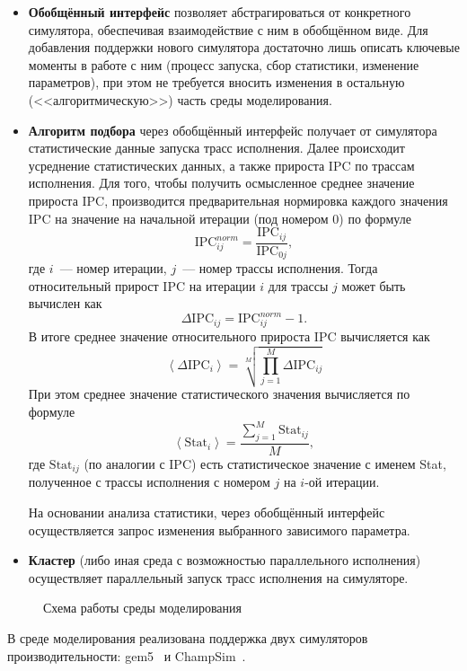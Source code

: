 \begin{itemize}
  \item \textbf{Обобщённый интерфейс} позволяет абстрагироваться от конкретного симулятора, обеспечивая взаимодействие с ним в обобщённом виде. Для добавления поддержки нового симулятора достаточно лишь описать ключевые моменты в работе с ним (процесс запуска, сбор статистики, изменение параметров), при этом не требуется вносить изменения в остальную (<<алгоритмическую>>) часть среды моделирования.
  \item \textbf{Алгоритм подбора} через обобщённый интерфейс получает от симулятора статистические данные запуска трасс исполнения. Далее происходит усреднение статистических данных, а также прироста IPC по трассам исполнения. Для того, чтобы получить осмысленное среднее значение прироста IPC, производится предварительная нормировка каждого значения IPC на значение на начальной итерации (под номером $0$) по формуле
  \[
    \text{IPC}_{ij}^{norm} = \dfrac{\text{IPC}_{ij}}{\text{IPC}_{0j}},
  \]
  где $i$~--- номер итерации, $j$~--- номер трассы исполнения. Тогда относительный прирост IPC на итерации $i$ для трассы $j$ может быть вычислен как
  \[
    \Delta \text{IPC}_{ij} = \text{IPC}_{ij}^{norm} - 1.
  \]
  В итоге среднее значение относительного прироста IPC вычисляется как
  \[
    \left\langle \Delta\text{IPC}_{i}\right\rangle =
    \sqrt[M]{\prod_{j = 1}^{M} \Delta \text{IPC}_{ij}}
  \]
  При этом среднее значение статистического значения  вычисляется по формуле
  \[
    \left\langle \text{Stat}_{i} \right\rangle =
    \dfrac{\displaystyle\sum_{j = 1}^{M} \text{Stat}_{ij}}{M},
  \]
  где $\text{Stat}_{ij}$ (по аналогии с IPC) есть статистическое значение с именем Stat, полученное с трассы исполнения с номером $j$ на $i$-ой итерации.

  На основании анализа статистики, через обобщённый интерфейс осуществляется запрос изменения выбранного зависимого параметра.
  \item \textbf{Кластер} (либо иная среда с возможностью параллельного исполнения) осуществляет параллельный запуск трасс исполнения на симуляторе.
\end{itemize}

\begin{figure}[ht!]
  \centering
  \scalebox{0.932}{
    
  }
  \caption{Схема работы среды моделирования}
  \label{fig:framework}
\end{figure}

В среде моделирования реализована поддержка двух симуляторов производительности: gem5~\cite{binkert2011gem5} и ChampSim~\cite{gober2022championship}.

